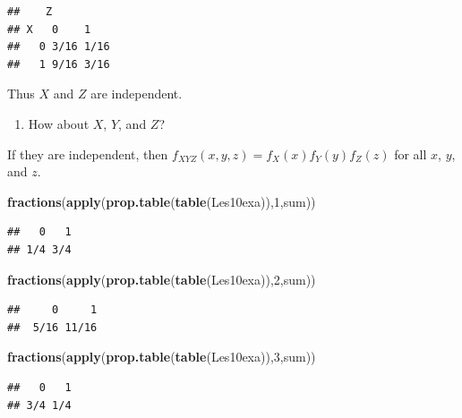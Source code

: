 \documentclass[]{book}
\newenvironment{Shaded}{\begin{snugshade}}{\end{snugshade}}
\newcommand{\KeywordTok}[1]{\textcolor[rgb]{0.13,0.29,0.53}{\textbf{#1}}}
\newcommand{\DecValTok}[1]{\textcolor[rgb]{0.00,0.00,0.81}{#1}}
\newcommand{\NormalTok}[1]{#1}
\providecommand{\tightlist}{%
  \setlength{\itemsep}{0pt}\setlength{\parskip}{0pt}}
\theoremstyle{definition}
\theoremstyle{definition}
\theoremstyle{definition}
\theoremstyle{remark}
\begin{document}
\begin{verbatim}
##    Z
## X   0    1   
##   0 3/16 1/16
##   1 9/16 3/16
\end{verbatim}

Thus \(X\) and \(Z\) are independent.

\begin{enumerate}
\def\labelenumi{\arabic{enumi}.}
\setcounter{enumi}{5}
\tightlist
\item
  How about \(X\), \(Y\), and \(Z\)?
\end{enumerate}

If they are independent, then
\(f_{XYZ}(x,y,z)=f_{X}(x)f_{Y}(y)f_{Z}(z)\) for all \(x\), \(y\), and
\(z\).

\begin{Shaded}
\begin{Highlighting}[]
\KeywordTok{fractions}\NormalTok{(}\KeywordTok{apply}\NormalTok{(}\KeywordTok{prop.table}\NormalTok{(}\KeywordTok{table}\NormalTok{(Les10exa)),}\DecValTok{1}\NormalTok{,sum))}
\end{Highlighting}
\end{Shaded}

\begin{verbatim}
##   0   1 
## 1/4 3/4
\end{verbatim}

\begin{Shaded}
\begin{Highlighting}[]
\KeywordTok{fractions}\NormalTok{(}\KeywordTok{apply}\NormalTok{(}\KeywordTok{prop.table}\NormalTok{(}\KeywordTok{table}\NormalTok{(Les10exa)),}\DecValTok{2}\NormalTok{,sum))}
\end{Highlighting}
\end{Shaded}

\begin{verbatim}
##     0     1 
##  5/16 11/16
\end{verbatim}

\begin{Shaded}
\begin{Highlighting}[]
\KeywordTok{fractions}\NormalTok{(}\KeywordTok{apply}\NormalTok{(}\KeywordTok{prop.table}\NormalTok{(}\KeywordTok{table}\NormalTok{(Les10exa)),}\DecValTok{3}\NormalTok{,sum))}
\end{Highlighting}
\end{Shaded}

\begin{verbatim}
##   0   1 
## 3/4 1/4
\end{verbatim}
\end{document}

